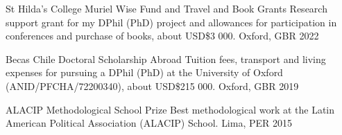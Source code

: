 \begin{cvhonors}
\cvhonor
{St Hilda's College Muriel Wise Fund and Travel and Book Grants} %
{Research support grant for my DPhil (PhD) project and allowances for participation in conferences and purchase of books, about USD\$3 000.}  %
{Oxford, GBR}
{2022}
\end{cvhonors}

\vspace{1mm}

\begin{cvhonors}
\cvhonor
{Becas Chile Doctoral Scholarship Abroad} 
{Tuition fees, transport and living expenses for pursuing a DPhil (PhD) at the University of Oxford (ANID/PFCHA/72200340), about USD\$215 000.} %
{Oxford, GBR}
{2019}
\end{cvhonors}

\vspace{1mm}





\begin{cvhonors}
\cvhonor
{ALACIP Methodological School Prize}
{Best methodological work at the Latin American Political Association (ALACIP) School.}
{Lima, PER}
{2015}
\end{cvhonors}

\vspace{1mm}


